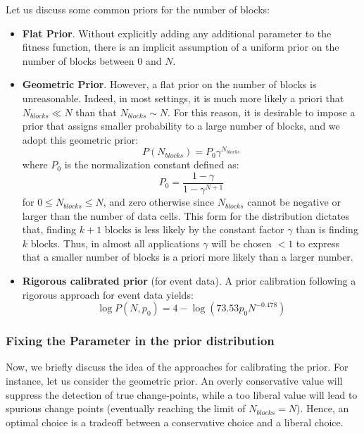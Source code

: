 \documentclass[prb,twocolumn]{revtex4-1}
\begin{document}
Let us discuss some common priors for the number of blocks:

\begin{itemize}
\item \textbf{Flat Prior}. Without explicitly adding any additional parameter to the fitness function, there is an implicit assumption of a uniform prior on the number of blocks between $0$ and $N$.

\item \textbf{Geometric Prior}. 
However, a flat prior on the number of blocks is unreasonable. Indeed, in most settings, it is much more likely a priori that $N_{blocks} \ll N$ than that $N_{blocks} \sim N$.
For this reason, it is desirable to impose a prior that assigns smaller probability to a large number of blocks, and we adopt this geometric prior:
\begin{equation}
P(N_{blocks}) = P_0 \gamma^{N_{blocks}}
\label{eq:gamma_prior}
\end{equation}
where $P_0$ is the normalization constant defined as:
\begin{equation}
P_0 = \frac{1-\gamma}{1-\gamma^{N+1}}
\end{equation}
for $0 \le N_{blocks} \le N$, and zero otherwise since $N_{blocks}$ cannot be negative or larger than the number of data cells.
This form for the distribution dictates that, finding $k + 1$ blocks is less likely by the constant factor $\gamma$ than is finding $k$ blocks.
Thus, in almost all applications $\gamma$ will be chosen $<1$ to express that a smaller number of blocks is a priori more likely than a larger number. 

\item \textbf{Rigorous calibrated prior} (for event data).
A prior calibration following a rigorous approach for event data yields:
\begin{equation}
\log P(N,p_0) = 4 - \log(73.53 p_0 N^{-0.478}) 
\label{eq:p0_prior}
\end{equation}

\end{itemize}


\subsubsection{Fixing the Parameter in the prior distribution}

Now, we briefly discuss the idea of the approaches for calibrating the prior.
For instance, let us consider the geometric prior. An overly conservative value will suppress the detection of true change-points, while a too liberal value will lead to spurious change points (eventually reaching the limit of $N_{blocks} = N$). 
Hence, an optimal choice is a tradeoff between a conservative choice and a liberal choice. 
\end{document}
